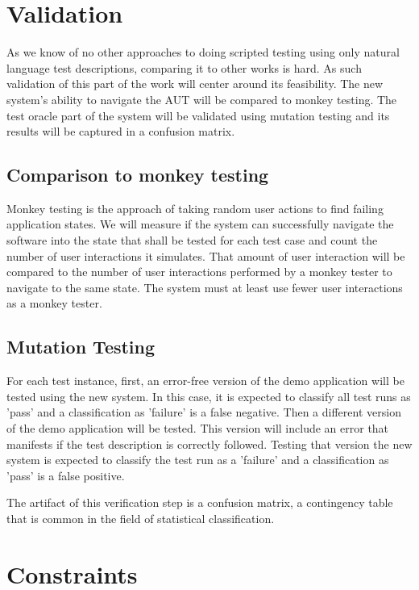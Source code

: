 \section{Validation}

As we know of no other approaches to doing scripted testing using only natural language test descriptions, comparing it to other works is hard.
As such validation of this part of the work will center around its feasibility.
The new system's ability to navigate the AUT will be compared to monkey testing.
The test oracle part of the system will be validated using mutation testing and its results will be captured in a confusion matrix.

\subsection{Comparison to monkey testing}

Monkey testing is the approach of taking random user actions to find failing application states.
We will measure if the system can successfully navigate the software into the state that shall be tested for each test case and count the number of user interactions it simulates.
That amount of user interaction will be compared to the number of user interactions performed by a monkey tester to navigate to the same state.
The system must at least use fewer user interactions as a monkey tester.

\subsection{Mutation Testing}

For each test instance, first, an error-free version of the demo application will be tested using the new system.
In this case, it is expected to classify all test runs as 'pass' and a classification as 'failure' is a false negative.
Then a different version of the demo application will be tested.
This version will include an error that manifests if the test description is correctly followed.
Testing that version the new system is expected to classify the test run as a 'failure' and a classification as 'pass' is a false positive.

The artifact of this verification step is a confusion matrix, a contingency table that is common in the field of statistical classification.

\section{Constraints}

